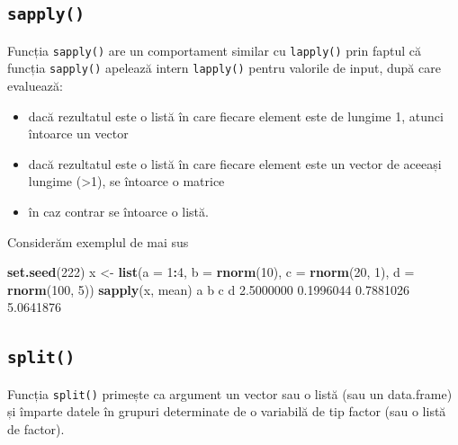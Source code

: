 \documentclass[]{article}
\newenvironment{Shaded}{\begin{snugshade}}{\end{snugshade}}
\newcommand{\DataTypeTok}[1]{\textcolor[rgb]{0.13,0.29,0.53}{#1}}
\newcommand{\DecValTok}[1]{\textcolor[rgb]{0.00,0.00,0.81}{#1}}
\newcommand{\FloatTok}[1]{\textcolor[rgb]{0.00,0.00,0.81}{#1}}
\newcommand{\KeywordTok}[1]{\textcolor[rgb]{0.13,0.29,0.53}{\textbf{#1}}}
\newcommand{\NormalTok}[1]{#1}
\newcommand{\OperatorTok}[1]{\textcolor[rgb]{0.81,0.36,0.00}{\textbf{#1}}}
\newcommand{\StringTok}[1]{\textcolor[rgb]{0.31,0.60,0.02}{#1}}
\newcounter{exo}[section]
\begin{document}
\hypertarget{sapply}{%
\subsection{\texorpdfstring{\texttt{sapply()}}{sapply()}}\label{sapply}}

Funcția \texttt{sapply()} are un comportament similar cu
\texttt{lapply()} prin faptul că funcția \texttt{sapply()} apelează
intern \texttt{lapply()} pentru valorile de input, după care evaluează:

\begin{itemize}
\item
  dacă rezultatul este o listă în care fiecare element este de lungime
  1, atunci întoarce un vector
\item
  dacă rezultatul este o listă în care fiecare element este un vector de
  aceeași lungime (\textgreater1), se întoarce o matrice
\item
  în caz contrar se întoarce o listă.
\end{itemize}

Considerăm exemplul de mai sus

\begin{Shaded}
\begin{Highlighting}[]
\KeywordTok{set.seed}\NormalTok{(}\DecValTok{222}\NormalTok{)}
\NormalTok{x <-}\StringTok{ }\KeywordTok{list}\NormalTok{(}\DataTypeTok{a =} \DecValTok{1}\OperatorTok{:}\DecValTok{4}\NormalTok{, }\DataTypeTok{b =} \KeywordTok{rnorm}\NormalTok{(}\DecValTok{10}\NormalTok{), }\DataTypeTok{c =} \KeywordTok{rnorm}\NormalTok{(}\DecValTok{20}\NormalTok{, }\DecValTok{1}\NormalTok{), }\DataTypeTok{d =} \KeywordTok{rnorm}\NormalTok{(}\DecValTok{100}\NormalTok{, }\DecValTok{5}\NormalTok{))}
\KeywordTok{sapply}\NormalTok{(x, mean)}
\NormalTok{        a         b         c         d }
\FloatTok{2.5000000} \FloatTok{0.1996044} \FloatTok{0.7881026} \FloatTok{5.0641876} 
\end{Highlighting}
\end{Shaded}

\hypertarget{split}{%
\subsection{\texorpdfstring{\texttt{split()}}{split()}}\label{split}}

Funcția \texttt{split()} primește ca argument un vector sau o listă (sau
un data.frame) și împarte datele în grupuri determinate de o variabilă
de tip factor (sau o listă de factor).
\end{document}
